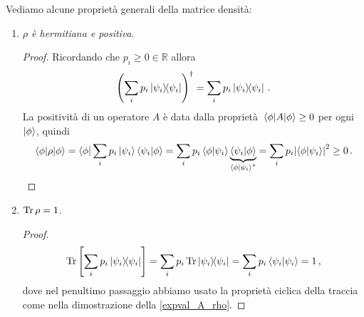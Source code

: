 \noindent Vediamo alcune proprietà generali della matrice densità:
\begin{enumerate}
    \item \textit{$\rho$ è hermitiana e positiva}. 
    \begin{proof}
        Ricordando che $p_i \geq 0 \in \mathbb{R}$ allora
        \begin{equation*}
            \left( \sum_i p_i \ketbra{\psi_i} \right)^\dag = \sum_i p_i \ketbra{\psi_i} \, .
        \end{equation*}
        La positività di un operatore $A$ è data dalla proprietà $\expval{A}{\phi} \geq 0$ per ogni $\ket{\phi}$, quindi
        \begin{equation*}
            \expval{\rho}{\phi} = \bra{\phi} \sum_i p_i \ket{\psi_i} \braket{\psi_i}{\phi} = \sum_i p_i \braket{\phi}{\psi_i} \underbrace{\braket{\psi_i}{\phi}}_{\braket{\phi}{\psi_i}^\ast} = \sum_i p_i \abs{\braket{\phi}{\psi_i}}^2 \geq 0 \, .
        \end{equation*}
    \end{proof}
    
    \item $\Tr \rho = 1$.
    \begin{proof}
        \begin{equation*}
            \Tr \left[ \sum_i p_i \ketbra{\psi_i} \right] = \sum_i p_i \Tr \ketbra{\psi_i} = \sum_i p_i \braket{\psi_i} = 1 \, ,
        \end{equation*}
        dove nel penultimo passaggio abbiamo usato la proprietà ciclica della traccia come nella dimostrazione della \eqref{expval_A_rho}.
    \end{proof}
    

\end{enumerate}
